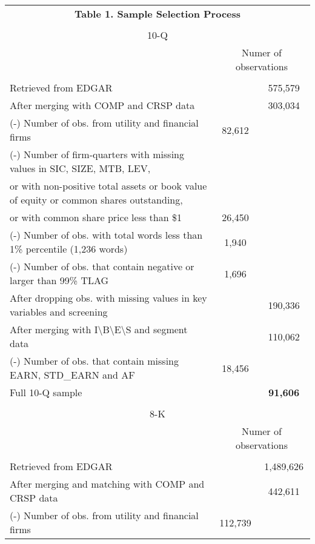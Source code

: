 \begin{table}[htbp] \label{T1}
  \centering
    \begin{tabular}{lcc}
    \multicolumn{3}{c}{\textbf{Table 1. Sample Selection Process}} \\ 
      & &  \\
    \multicolumn{3}{c}{10-Q} \\
     &   \multicolumn{2}{c}{Numer of observations}\\
      & &  \\
    Retrieved from EDGAR & & 575,579 \\
    After merging with COMP and CRSP data & & 303,034 \\
    (-) Number of obs. from utility and financial firms & 82,612 & \\
    (-) Number of firm-quarters with missing values in SIC, SIZE, MTB, LEV, & & \\
    \hspace{5mm}or with non-positive total assets or book value of equity or common shares outstanding, & & \\
    \hspace{5mm}or with common share price less than \$1 & 26,450 & \\
    (-) Number of obs. with total words less than 1\% percentile (1,236 words) & 1,940 & \\
    (-) Number of obs. that contain negative or larger than 99\% TLAG & 1,696 & \\
    \bottomrule
    After dropping obs. with missing values in key variables and screening & & 190,336 \\
    After merging with I\textbackslash{}B\textbackslash{}E\textbackslash{}S and segment data & & 110,062 \\
    (-) Number of obs. that contain missing EARN, STD\_EARN and AF & 18,456 & \\
    \bottomrule
    Full 10-Q sample & & \textbf{91,606} \\
      & &  \\
    \multicolumn{3}{c}{8-K} \\
     &   \multicolumn{2}{c}{Numer of observations}\\
      & &  \\
    Retrieved from EDGAR & & 1,489,626 \\
    After merging and matching with COMP and CRSP data  & & 442,611 \\
    (-) Number of obs. from utility and financial firms & 112,739 & \\

\end{tabular}
\end{table}
